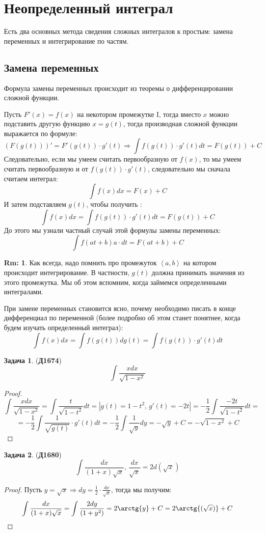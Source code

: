 \documentclass[12pt]{article}
\newcommand{\RN}[1]{%
	\textup{\uppercase\expandafter{\romannumeral#1}}%
}
\newcommand{\MI}{\mathrm{I}}
\theoremstyle{definition}
\newtheorem{rem}{Rm:}
\newtheorem{problem}{Задача}
\DeclareMathOperator{\dint}{\displaystyle\int}
\newcommand{\inner}[2]{\left\langle #1, #2 \right\rangle }
\begin{document}
\lhead{Математический анализ - \RN{2}}
\section*{Неопределенный интеграл}

Есть два основных метода сведения сложных интегралов к простым: замена переменных и интегрирование по частям.

\subsection*{Замена переменных}
Формула замены переменных происходит из теоремы о дифференцировании сложной функции.

Пусть $F'(x) = f(x)$ на некотором промежутке $\MI$, тогда вместо $x$ можно подставить другую функцию $x = g(t)$, тогда производная сложной функции выражается по формуле:
$$
	\left(F(g(t))\right)' = F'(g(t)){\cdot}g'(t) \Rightarrow \dint f(g(t)){\cdot}g'(t)dt = F(g(t)) +C
$$
Следовательно, если мы умеем считать первообразную от $f(x)$, то мы умеем считать первообразную и от $f(g(t)){\cdot}g'(t)$, следовательно мы сначала считаем интеграл:
$$
	\dint f(x) dx = F(x) + C
$$
И затем подставляем $g(t)$, чтобы получить\textbf{ }:
$$
	\dint f(x)dx = \dint f(g(t)){\cdot}g'(t)dt  = F(g(t)) + C
$$
До этого мы узнали частный случай этой формулы замены переменных:
$$
	\dint f(at + b) a{\cdot}dt = F(at + b) + C
$$
\begin{rem}
	Как всегда, надо помнить про промежуток $\inner{a}{b}$ на котором происходит интегрирование. В частности, $g(t)$ должна принимать значения из этого промежутка. Мы об этом вспомним, когда займемся определенными интегралами.
\end{rem}
При замене переменных становится ясно, почему необходимо писать в конце дифференциал по переменной (более подробно об этом станет понятнее, когда будем изучать определенный интеграл):
$$
	\dint f(x) dx = \dint f(g(t)) dg(t) = \dint f(g(t)){\cdot} g'(t)dt
$$

\begin{problem}(\textbf{Д1674})
	$$
		\dint \dfrac{xdx}{\sqrt{1-x^2}}
	$$
\end{problem}
\begin{proof}
	$$
		\dint \dfrac{xdx}{\sqrt{1-x^2}} = \dint \dfrac{t}{\sqrt{1 - t^2}}dt = |g(t) = 1 - t^2, \, g'(t) = -2t| = -\dfrac{1}{2}\dint \dfrac{-2t}{\sqrt{1 - t^2}}dt = 
	$$
	$$
		= -\dfrac{1}{2}\dint \dfrac{1}{\sqrt{g(t)}}{\cdot}g'(t)dt = -\dfrac{1}{2}\dint\dfrac{1}{\sqrt{y}}dy = -\sqrt{y} + C = - \sqrt{1 -x^2} + C
	$$
\end{proof}
\newpage
\begin{problem}(\textbf{Д1680})
	$$
		\dint \dfrac{dx}{(1 + x)\sqrt{x}}, \, \dfrac{dx}{\sqrt{x}} = 2d(\sqrt{x})
	$$
\end{problem}
\begin{proof}
	Пусть $y = \sqrt{x} \Rightarrow dy = \tfrac{1}{2}{\cdot}\tfrac{dx}{\sqrt{x}}$, тогда мы получим:
	$$
		\dint \dfrac{dx}{(1 + x)\sqrt{x}} = \dint \dfrac{2dy}{(1 + y^2 )} = 2 \arctg{y} + C = 2 \arctg{(\sqrt{x})} + C
	$$
\end{proof}
\end{document}
